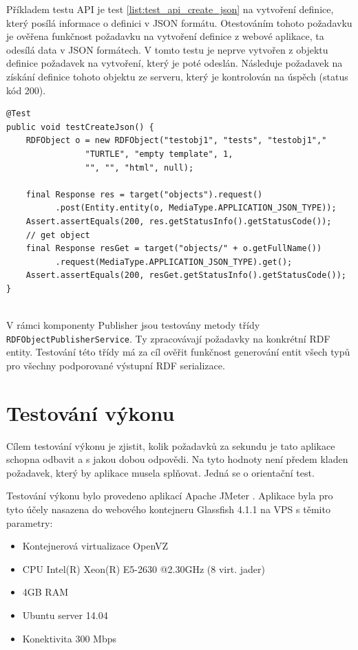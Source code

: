 \documentclass[thesis=B,czech]{FITthesis}[2012/06/26]
\begin{document}
Příkladem testu API je test \ref{list:test_api_create_json} na vytvoření definice, který posílá
informace o definici v JSON formátu. Otestováním tohoto požadavku je ověřena funkčnost požadavku na vytvoření definice z webové aplikace,
ta odesílá data v JSON formátech. V tomto testu je neprve vytvořen z objektu definice požadavek na vytvoření, který je poté odeslán. Následuje požadavek
na získání definice tohoto objektu ze serveru, který je kontrolován na úspěch (status kód 200).
  \begin{lstlisting}[float=htb,caption={Test vytvoření definice přes API v JSON formátu},label=list:test_api_create_json]
@Test
public void testCreateJson() {
    RDFObject o = new RDFObject("testobj1", "tests", "testobj1","
				"TURTLE", "empty template", 1,
				"", "", "html", null);

    final Response res = target("objects").request()
	      .post(Entity.entity(o, MediaType.APPLICATION_JSON_TYPE));
    Assert.assertEquals(200, res.getStatusInfo().getStatusCode());
    // get object
    final Response resGet = target("objects/" + o.getFullName())
	      .request(MediaType.APPLICATION_JSON_TYPE).get();
    Assert.assertEquals(200, resGet.getStatusInfo().getStatusCode());
}
    
\end{lstlisting}

V rámci komponenty Publisher jsou testovány metody třídy \\ \texttt{RDFObjectPublisherService}. Ty zpracovávají požadavky na konkrétní RDF entity.
Testování této třídy má za cíl ověřit funkčnost generování entit všech typů pro všechny podporované výstupní RDF serializace.

  
  \section{Testování výkonu}\label{performance_test}
  Cílem testování výkonu je zjistit, kolik požadavků za sekundu je tato aplikace schopna odbavit a s jakou dobou odpovědi.
  Na tyto hodnoty není předem kladen požadavek, který by aplikace
  musela splňovat. Jedná se o orientační test.
  
  Testování výkonu bylo provedeno aplikací Apache JMeter \cite{jmeter}. Aplikace byla pro tyto účely nasazena do webového kontejneru Glassfish 4.1.1 \cite{glassfish}
  na VPS s těmito parametry:
  \begin{itemize}
   \item Kontejnerová virtualizace OpenVZ
   \item CPU Intel(R) Xeon(R) E5-2630 @2.30GHz (8 virt. jader)
   \item 4GB RAM
   \item Ubuntu server 14.04
   \item Konektivita 300 Mbps
  \end{itemize}
  
\end{document}
